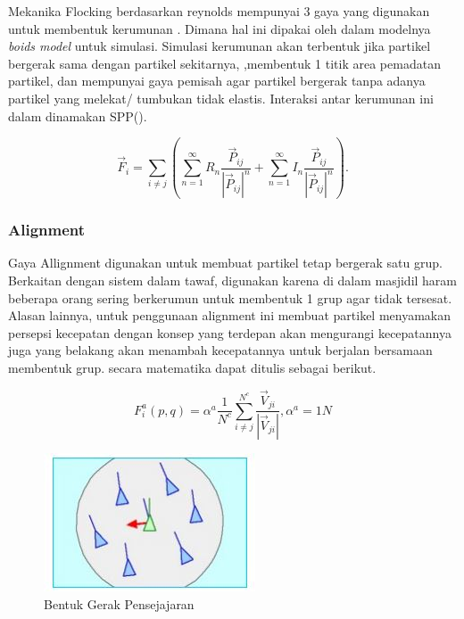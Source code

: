 Mekanika Flocking berdasarkan reynolds mempunyai 3 gaya yang digunakan untuk membentuk kerumunan   \citep{Reynolds1987} \citep{Nasir2016}. Dimana hal ini dipakai oleh \citep{Chate2008} dalam modelnya \emph{boids model} untuk simulasi. Simulasi kerumunan akan terbentuk jika partikel bergerak sama dengan partikel sekitarnya, ,membentuk 1 titik area pemadatan partikel, dan mempunyai gaya pemisah agar partikel bergerak tanpa adanya partikel yang melekat/ tumbukan tidak elastis. Interaksi antar kerumunan ini dalam \citep{Chate2008} dinamakan SPP(). 

\begin{equation}
\vec{F}_i = \sum_{i \neq j} (\sum_{n=1}^{\infty} R_{n} \dfrac{\vec{P}_{ij}}{|\vec{P}_{ij}|^n}  + \sum_{n=1}^{\infty} I_{n} \dfrac{\vec{P}_{ij}}{|\vec{P}_{ij}|^n}). 
\end{equation}

\subsubsection{Alignment}\label{sec:alignment}
\hspace {0.5cm} Gaya Allignment digunakan untuk membuat partikel tetap bergerak satu grup. Berkaitan dengan sistem dalam tawaf, digunakan karena di dalam masjidil haram beberapa orang sering berkerumun untuk membentuk 1 grup agar tidak tersesat. Alasan lainnya, untuk penggunaan alignment ini membuat partikel menyamakan persepsi kecepatan dengan konsep yang terdepan akan mengurangi kecepatannya juga yang belakang akan menambah kecepatannya untuk berjalan bersamaan membentuk grup. secara matematika dapat ditulis sebagai berikut.

\begin{equation}
 F_i^a(p,q) = \alpha^a \dfrac{1}{N^c}\sum^{N^c}_{i \neq j}\dfrac{\vec{V}_{ji}}{|\vec{V}_{ji}|},\alpha^a = 1N
\end{equation}


\begin{figure}
\centering
\includegraphics[scale=0.5]{gambar/allignment}
\caption{Bentuk Gerak Pensejajaran}
\end{figure}

